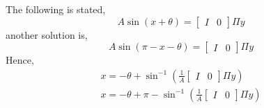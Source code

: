 The following is stated,
\begin{equation}
    A \sin(x+\theta)=\begin{bmatrix}I& 0\end{bmatrix}\Pi y
\end{equation}
another solution is,
\begin{equation}
    A \sin(\pi-x-\theta)=\begin{bmatrix}I& 0\end{bmatrix}\Pi y
\end{equation}
Hence,
\begin{gather}
     x=-\theta+\sin^{-1}\left(\frac{1}{A}\begin{bmatrix}I& 0\end{bmatrix}\Pi y \right) \\
     x=-\theta+\pi-\sin^{-1}\left(\frac{1}{A}\begin{bmatrix}I& 0\end{bmatrix}\Pi y \right) 
\end{gather}



